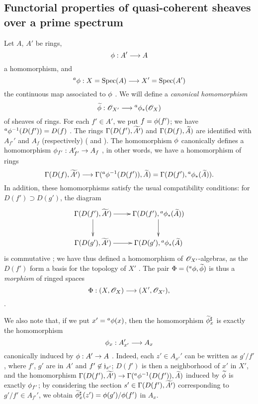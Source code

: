 \subsection{Functorial properties of quasi-coherent sheaves over a prime spectrum}
\label{subsection-func-qcoh-over-spec}

\begin{env}[1.6.1]
\label{1.1.6.1}
Let $A$, $A'$ be rings,
\[
  \vphi:A'\to A
\]
a homomorphism, and
\[
  {}^a\vphi:X=\Spec(A)\to X'=\Spec(A')
\]
the continuous map associated to $\phi$ .
We will define a \emph{canonical homomorphism}
\[
  \wt{\vphi}:\OO_{X'}\to{}^a\vphi_*(\OO_X)
\]
of sheaves of rings.
For each $f'\in A'$, we put $f=\phi(f')$;
we have ${}^a\phi^{-1}(D(f'))=D(f)$ .
The rings $\Gamma(D(f'),{\widetilde{A'}})$ and $\Gamma(D(f),{\widetilde{A}})$ are identified  with $A_{f'}'$ and $A_f$ (respectively) ( and ). The homomorphism $\phi$ canonically defines a homomorphism $\vphi_{f'}:A_{f'}'\to A_f$ , in other words, we have a homomorphism of rings
\[
  \Gamma(D(f),\wt{A'})\to\Gamma({}^a\vphi^{-1}(D(f')),\wt{A})
  =\Gamma(D(f'),{}^a\vphi_*(\wt{A})).
\]
In addition, these homomorphisms satisfy the usual compatibility conditions: for $D(f')\supset D(g')$, the diagram
\[
  \xymatrix{
    \Gamma(D(f'),\wt{A'})\ar[r]\ar[d] &
    \Gamma(D(f'),{}^a\vphi_*(\wt{A}))\ar[d]\\
    \Gamma(D(g'),\wt{A'})\ar[r] &
    \Gamma(D(g'),{}^a\vphi_*(\wt{A})
  }
\]
is commutative ;
we have thus defined a homomorphism of $\mathscr{O}_{X'}$-algebras, as the $D(f')$ form a basis for the topology of $X'$ .
The pair $\Phi=({}^a\phi,{\widetilde{\phi}})$ is thus a \emph{morphism} of ringed spaces
\[
  \Phi:(X,\OO_X)\to(X',\OO_{X'}),
\]
.

We also note that, if we put $x'={}^a\phi(x)$, then the homomorphism ${\widetilde{\phi}}_x^\sharp$  is exactly the homomorphism
\[
  \vphi_x:A_{x'}'\to A_x
\]
canonically induced by $\vphi:A'\to A$ .
Indeed, each $z'\in A_{x'}'$ can be written as $g'/f'$, where $f'$, $g'$ are in $A'$ and $f'\not\in\mathfrak{j}_{x'}$;
$D(f')$ is then a neighborhood of $x'$ in $X'$, and the homomorphism $\Gamma(D(f'),\wt{A'})\to\Gamma({}^a\vphi^{-1}(D(f')),\wt{A})$ induced by ${\widetilde{\phi}}$ is exactly $\phi_{f'}$;
by considering the section $s'\in\Gamma(D(f'),{\widetilde{A'}})$ corresponding to $g'/f'\in A_{f'}'$, we obtain ${\widetilde{\phi}}_x^\sharp(z')=\phi(g')/\phi(f')$ in $A_x$.
\end{env}

